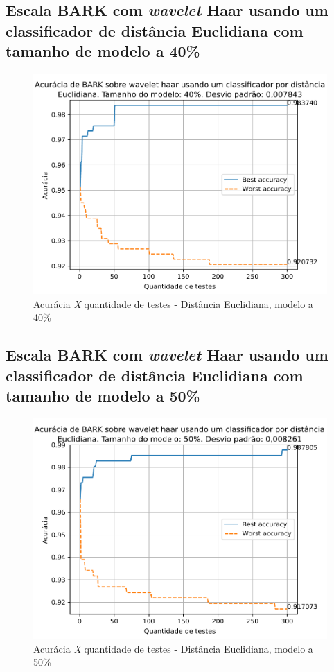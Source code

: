 		\newpage
		\subsection{Escala BARK com \textit{wavelet} Haar usando um classificador de distância Euclidiana com tamanho de modelo a 40\%}
			\begin{figure}[ht]
				\centering
				\includegraphics{images/results/confusionMatrices/classifier_Euclidian_40}
				\caption{Acurácia \textit{X} quantidade de testes - Distância Euclidiana, modelo a 40\%}
				\label{fig:classifiereuclidian40}
			\end{figure}
			
	
		\newpage
		\subsection{Escala BARK com \textit{wavelet} Haar usando um classificador de distância Euclidiana com tamanho de modelo a 50\%}
		\begin{figure}[ht]
			\centering
			\includegraphics{images/results/confusionMatrices/classifier_Euclidian_50}
			\caption{Acurácia \textit{X} quantidade de testes - Distância Euclidiana, modelo a 50\%}
			\label{fig:classifiereuclidian50}
		\end{figure}
		
	
